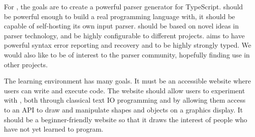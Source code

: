 For \tsPEG{}, the goals are to create a powerful parser generator for TypeScript. \tsPEG{} should be powerful enough to build a real programming language with, it should be capable of self-hosting its own input parser. \tsPEG{} should be based on novel ideas in parser technology, and be highly configurable to different projects. \tsPEG{} aims to have powerful syntax error reporting and recovery and to be highly strongly typed. We would also like \tsPEG{} to be of interest to the parser community, hopefully finding use in other projects.

The learning environment has many goals. It must be an accessible website where users can write and execute \Setanta{} code. The website should allow users to experiment with \Setanta{}, both through classical text IO programming and by allowing them access to an API to draw and manipulate shapes and objects on a graphics display. It should be a beginner-friendly website so that it draws the interest of people who have not yet learned to program.

